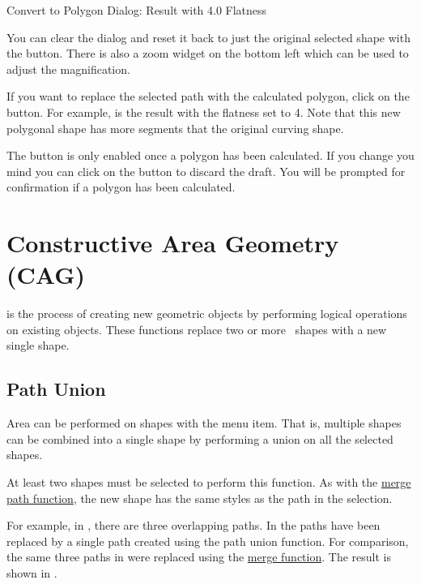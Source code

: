 {}
{Convert to Polygon Dialog: Result with 4.0 Flatness}


You can clear the dialog and reset it back to just the original
selected shape with the  button.
There is also a zoom widget on the bottom left which can be used to
adjust the magnification.

If you want to replace the selected path with the
calculated polygon, click on the  button.  For example,
 is the result with the flatness set
to 4. Note that this new polygonal shape has more segments that the 
original curving shape.

\begin{information}
The  button is only enabled once a polygon has been
calculated. If you change you mind you can click on the 
button to discard the draft. You will be prompted for confirmation
if a polygon has been calculated.
\end{information}


\section{Constructive Area Geometry (CAG)}\label{sec:cag}

 is the process of creating new geometric objects by
performing logical operations on existing objects. These functions
replace two or more \selected\ \glspl*{shape} with a new single
\gls{shape}.

\subsection{Path Union}\label{sec:pathunion}


Area  can be performed on
\glspl{shape} with the  menu item. That is,
multiple \glspl{shape} can be combined into a single \gls*{shape} by
performing a union on all the selected \glspl*{shape}.

At least two \glspl*{shape} must be selected to perform this
function. As with the \hyperref[sec:mergepaths]{merge path function}, the
new shape has the same styles as the  path
in the selection.

For example, in , there are three
overlapping paths.  In  the paths have
been replaced by a single path created using the path union
function. For comparison, the same three paths in
 were replaced using the
\hyperref[sec:mergepaths]{merge function}. The result is shown in
.

